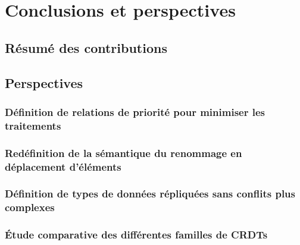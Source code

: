 \documentclass[12pt]{thesul}
\newcommand{\lepoch}{$<_{\varepsilon}$~}
\begin{document}

\NumberThisInToc
\chapter{Conclusions et perspectives}
\minitoc
\section{Résumé des contributions}
\section{Perspectives}


\subsection{Définition de relations de priorité pour minimiser les traitements}
\subsection{Redéfinition de la sémantique du renommage en déplacement d'éléments}
\subsection{Définition de types de données répliquées sans conflits plus complexes}

\subsection{Étude comparative des différentes familles de CRDTs}
\end{document}
